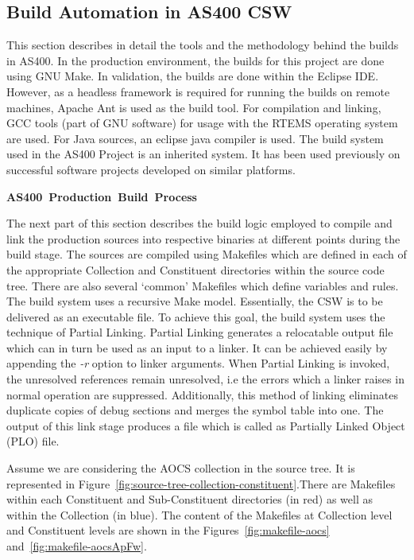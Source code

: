 \documentclass[12pt, a4paper, titlepage]{scrartcl}
\newcommand{\courierword}[1]{\textsf{\itshape #1}}{\fontfamily{pcr}\selectfont}%
\begin{document}
\subsection{Build Automation in AS400 CSW}
This section describes in detail the tools and the methodology behind the builds in AS400. In the production environment, the builds for this project are done using GNU Make. In validation, the builds are done within the Eclipse IDE. However, as a headless framework is required for running the builds on remote machines, Apache Ant is used as the build tool. For compilation and linking, GCC tools (part of GNU software) for usage with the RTEMS operating system are used. For Java sources, an eclipse java compiler is used. 
The build system used in the AS400 Project is an inherited system. It has been used previously on successful software projects developed on similar platforms.
\par \textbf{AS400\ Production\ Build\ Process}
\par The next part of this section describes the build logic employed to compile and link the production sources into respective binaries at different points during the build stage. The sources are compiled using Makefiles which are defined in each of the appropriate Collection and Constituent directories within the source code tree. There are also several ‘common’ Makefiles which define variables and rules. The build system uses a recursive Make\cite{stallman1991gnu} model.   
Essentially, the CSW is to be delivered as an executable file. To achieve this goal, the build system uses the technique of Partial Linking\cite{ARMPartialLinking}. Partial Linking generates a relocatable output file which can in turn be used as an input to a linker. It can be achieved easily by appending the \courierword{-r} option to linker arguments. When Partial Linking is invoked, the unresolved references remain unresolved, i.e the errors which a linker raises in normal operation are suppressed. Additionally, this method of linking eliminates duplicate copies of debug sections and merges the symbol table into one. The output of this link stage produces a file which is called as Partially Linked Object (PLO) file.
\par Assume we are considering the AOCS collection in the source tree. It is represented in Figure~\ref{fig:source-tree-collection-constituent}.There are Makefiles within each Constituent and Sub-Constituent directories (in red) as well as within the Collection (in blue). The content of the Makefiles at Collection level and Constituent levels are shown in the Figures~\ref{fig:makefile-aocs} and~\ref{fig:makefile-aocsApFw}. 
\end{document}
